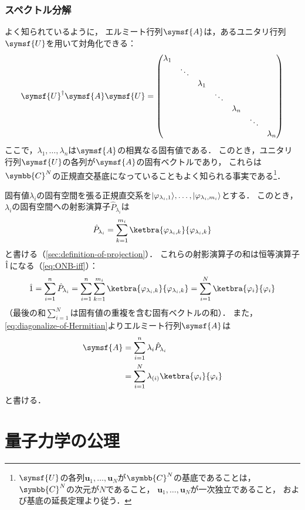 \documentclass[
]{sotsu}
\begin{document}
\subsubsection{スペクトル分解}

よく知られているように，
エルミート行列$\symsf{A}$は，あるユニタリ行列$\symsf{U}$を用いて対角化できる：
\begin{equation}
    \label{eq:diagonalize-of-Hermitian}
    \adjoint{\symsf{U}} \symsf{A} \symsf{U}
        = 
        \begin{pmatrix}
            \lambda_1  \\
            & \ddots  \\
            & & \lambda_1  \\
            & & & \ddots  \\
            & & & & \lambda_n  \\
            & & & & & \ddots  \\
            & & & & & & \lambda_n
        \end{pmatrix}
\end{equation}
ここで，$\lambda_1, \dots, \lambda_n$は$\symsf{A}$の相異なる固有値である．
このとき，ユニタリ行列$\symsf{U}$の各列が$\symsf{A}$の固有ベクトルであり，
これらは$\symbb{C}^N$の正規直交基底になっていることもよく知られる事実である\footnote{
    $\symsf{U}$の各列$\symbf{u}_1, \dots, \symbf{u}_N$が$\symbb{C}^N$の基底であることは，
    $\symbb{C}^N$の次元が$N$であること，
    $\symbf{u}_1, \dots, \symbf{u}_N$が一次独立であること，
    および基底の延長定理より従う．
}．

固有値$\lambda_i$の固有空間を張る正規直交系を$\lvert\varphi_{\lambda_i, 1}\rangle, \dots, \lvert\varphi_{\lambda_i, m_i}\rangle$とする．
このとき，$\lambda_i$の固有空間への射影演算子$\hat{P}_{\lambda_i}$は
\begin{equation*}
    \hat{P}_{\lambda_i} = 
        \sum_{k = 1}^{m_i} \ketbra{\varphi_{\lambda_i, k}}{\varphi_{\lambda_i, k}}
\end{equation*}
と書ける（\cref{sec:definition-of-projection}）．
これらの射影演算子の和は恒等演算子$\hat{1}$になる（\cref{eq:ONB-iff}）：
\begin{equation*}
    \idop 
    = \sum_{i = 1}^{n} \hat{P}_{\lambda_i}
    = \sum_{i = 1}^{n} \sum_{k = 1}^{m_i} \ketbra{\varphi_{\lambda_i, k}}{\varphi_{\lambda_i, k}}
    = \sum_{i = 1}^{N} \ketbra{\varphi_i}{\varphi_i}
\end{equation*}
（最後の和$\sum_{i = 1}^{N}$は固有値の重複を含む固有ベクトルの和）．
また，
\cref{eq:diagonalize-of-Hermitian}よりエルミート行列$\symsf{A}$は
\begin{align}
    \symsf{A} &= \sum_{i = 1}^{n} \lambda_i \hat{P}_{\lambda_i}
    \\
              &= \sum_{i = 1}^{N} \lambda_{(i)} \ketbra{\varphi_i}{\varphi_i}
\end{align}
と書ける．




\section{量子力学の公理}
\end{document}
